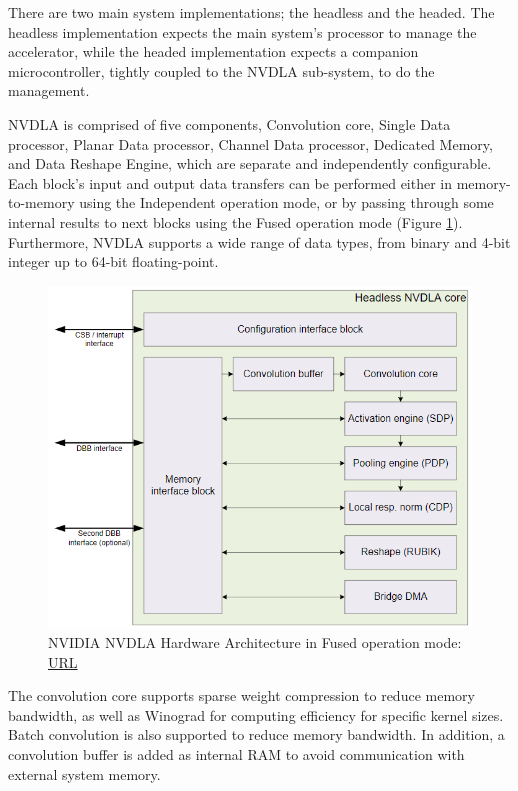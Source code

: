 There are two main system implementations; the headless and the headed. The headless implementation expects the main system's processor to manage the accelerator, while the headed implementation expects a companion microcontroller, tightly coupled to the NVDLA sub-system, to do the management.

NVDLA is comprised of five components, Convolution core, Single Data processor, Planar Data processor, Channel Data processor, Dedicated Memory, and Data Reshape Engine, which are separate and independently configurable. Each block's input and output data transfers can be performed either in memory-to-memory using the Independent operation mode, or by passing through some internal results to next blocks using the Fused operation mode (Figure \ref{fig:nvdla-hardware-architecture}). Furthermore, NVDLA supports a wide range of data types, from binary and 4-bit integer up to 64-bit floating-point.

\begin{figure} [H]
	\centering
	\includegraphics[scale=0.6]{Images/Hardware/nvdla-hardware-architecture.png}
	\decoRule
	\caption[NVIDIA NVDLA Hardware Architecture]{NVIDIA NVDLA Hardware Architecture in Fused operation mode: \href{http://nvdla.org/primer.html}{URL}}
	\label{fig:nvdla-hardware-architecture}
\end{figure}

The convolution core supports sparse weight compression to reduce memory bandwidth, as well as Winograd for computing efficiency for specific kernel sizes. Batch convolution is also supported to reduce memory bandwidth. In addition, a convolution buffer is added as internal RAM to avoid communication with external system memory.

